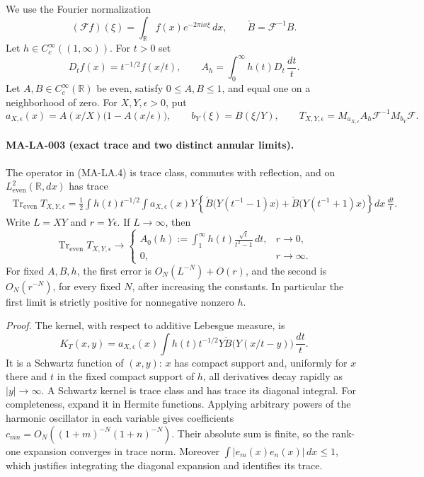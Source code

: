 We use the Fourier normalization
\[
 (\mathcal F f)(\xi)=\int_{\mathbb R}f(x)e^{-2\pi i x\xi}\,dx,
 \qquad \check B=\mathcal F^{-1}B.
\]
Let $h\in C_c^\infty((1,\infty))$.  For $t>0$ set
\[
 D_tf(x)=t^{-1/2}f(x/t),\qquad
 A_h=\int_0^\infty h(t)D_t\,\frac{dt}{t}.
\]
Let $A,B\in C_c^\infty(\mathbb R)$ be even, satisfy $0\le A,B\le1$,
and equal one on a neighborhood of zero.  For $X,Y,\epsilon>0$, put
\[
 a_{X,\epsilon}(x)=A(x/X)\bigl(1-A(x/\epsilon)\bigr),
 \qquad b_Y(\xi)=B(\xi/Y),
 \qquad T_{X,Y,\epsilon}=M_{a_{X,\epsilon}}A_h
       \mathcal F^{-1}M_{b_Y}\mathcal F.
 \tag{MA-LA.4}
\]

\paragraph{MA-LA-003 (exact trace and two distinct annular limits).}
The operator in (MA-LA.4) is trace class, commutes with reflection,
and on $L^2_{\mathrm{even}}(\mathbb R,dx)$ has trace
\begin{align*}
 \operatorname{Tr}_{\mathrm{even}}T_{X,Y,\epsilon}
  =\frac12\int h(t)t^{-1/2}
   \int a_{X,\epsilon}(x)Y
   \left\{\check B\bigl(Y(t^{-1}-1)x\bigr)
          +\check B\bigl(Y(t^{-1}+1)x\bigr)\right\}
      dx\,\frac{dt}{t}.
 \tag{MA-LA.5}
\end{align*}
Write $L=XY$ and $r=Y\epsilon$.  If $L\to\infty$, then
\[
 \operatorname{Tr}_{\mathrm{even}}T_{X,Y,\epsilon}
 \longrightarrow
 \begin{cases}
 A_0(h):=\displaystyle\int_1^\infty
             h(t)\frac{\sqrt t}{t^2-1}\,dt,&r\to0,\\[6pt]
 0,&r\to\infty.
 \end{cases}
 \tag{MA-LA.6}
\]
For fixed $A,B,h$, the first error is
$O_N(L^{-N})+O(r)$, and the second is $O_N(r^{-N})$, for every
fixed $N$, after increasing the constants.  In particular the first
limit is strictly positive for nonnegative nonzero $h$.

\emph{Proof.}
The kernel, with respect to additive Lebesgue measure, is
\[
 K_T(x,y)=a_{X,\epsilon}(x)
 \int h(t)t^{-1/2}Y\check B\bigl(Y(x/t-y)\bigr)\,\frac{dt}{t}.
 \tag{MA-LA.7}
\]
It is a Schwartz function of $(x,y)$: $x$ has compact support and,
uniformly for $x$ there and $t$ in the fixed compact support of $h$,
all derivatives decay rapidly as $|y|\to\infty$.  A Schwartz kernel
is trace class and has trace its diagonal integral.  For completeness,
expand it in Hermite functions.  Applying arbitrary powers of the
harmonic oscillator in each variable gives coefficients
$c_{mn}=O_N((1+m)^{-N}(1+n)^{-N})$.  Their absolute sum is finite,
so the rank-one expansion converges in trace norm.  Moreover
$\int|e_m(x)e_n(x)|\,dx\le1$, which justifies integrating the
diagonal expansion and identifies its trace.

